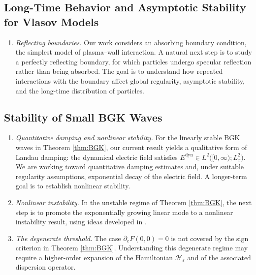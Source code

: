 \documentclass[10pt,reqno]{amsart}
\theoremstyle{definition}
\begin{document}
{\begin{enumerate}
\end{enumerate}

\subsection*{Long-Time Behavior and Asymptotic Stability for Vlasov Models}

\begin{enumerate}

\item \textit{Reflecting boundaries.}
Our work \cite{HPS24} considers an absorbing boundary condition, the simplest model of plasma--wall interaction. A natural next step is to study a perfectly reflecting boundary, for which particles undergo specular reflection rather than being absorbed. The goal is to understand how repeated interactions with the boundary affect global regularity, asymptotic stability, and the long-time distribution of particles.

\end{enumerate}

\subsection*{Stability of Small BGK Waves}

\begin{enumerate}

\item \textit{Quantitative damping and nonlinear stability.}
For the linearly stable BGK waves in Theorem \ref{thm:BGK}, our current result yields a qualitative form of Landau damping: the dynamical electric field satisfies
\(
E^{\mathrm{dyn}}
\in
L^2\bigl([0,\infty);L_x^2\bigr).
\)
We are working toward quantitative damping estimates and, under suitable regularity assumptions, exponential decay of the electric field. A longer-term goal is to establish nonlinear stability.

\item \textit{Nonlinear instability.}
In the unstable regime of Theorem \ref{thm:BGK}, the next step is  to promote the exponentially growing linear mode to a nonlinear instability result, using ideas developed in \cite{GS95,L01,L05}.

\item \textit{The degenerate threshold.}
The case
\(
\partial_e F(0,0)=0
\)
is not covered by the sign criterion in Theorem \ref{thm:BGK}. Understanding this degenerate regime may require a higher-order expansion of the Hamiltonian $\mathcal H_\varepsilon$ and of the associated dispersion operator.


\end{enumerate}}
\end{document}
